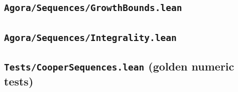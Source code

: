 \documentclass[11pt]{article}
\begin{document}
\subsection{\texttt{Agora/Sequences/GrowthBounds.lean}}
\label{app:growth-bounds}


\subsection{\texttt{Agora/Sequences/Integrality.lean}}
\label{app:integrality}


\subsection{\texttt{Tests/CooperSequences.lean} (golden numeric tests)}
\label{app:tests}

\end{document}
